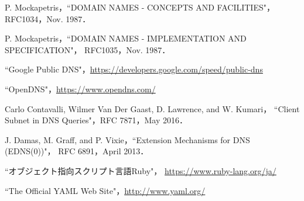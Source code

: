 \documentclass[a4j,12pt,onecolumn,oneside,titlepage,openany,final]{jreport}
\begin{document}
\begin{thebibliography}{99}
P. Mockapetris，``DOMAIN NAMES - CONCEPTS AND FACILITIES"，
RFC1034，Nov. 1987．

P. Mockapetris，``DOMAIN NAMES - IMPLEMENTATION AND SPECIFICATION"，
RFC1035，Nov. 1987．

``Google Public DNS"，\url{https://developers.google.com/speed/public-dns}

``OpenDNS"，\url{https://www.opendns.com/}

Carlo Contavalli, Wilmer Van Der Gaast, D. Lawrence, and W. Kumari，
``Client Subnet in DNS Queries"，RFC 7871，May 2016．

J. Damas, M. Graff, and P. Vixie，``Extension Mechanisms for DNS (EDNS(0))"，
RFC 6891，April 2013．

``オブジェクト指向スクリプト言語Ruby"， \url{https://www.ruby-lang.org/ja/}

``The Official YAML Web Site"，\url{http://www.yaml.org/}


\end{thebibliography}

\appendix
\end{document}
